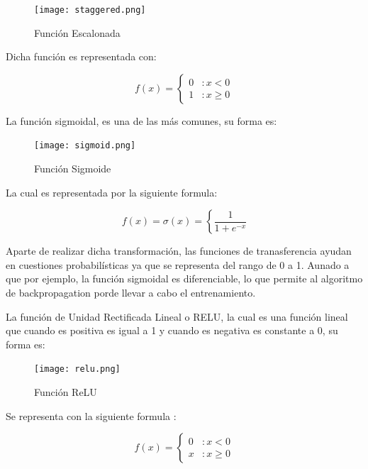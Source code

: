                 \begin{figure}[H]
                    \centering
                    \texttt{[image: staggered.png]}
                    \caption{Funci\'on Escalonada}
                    \label{fig:fig4}
                \end{figure}

                Dicha funci\'on es representada con: 
                
                \[f(x) = \left\{ \begin{array}{lr} 0 & : x < 0\\ 1 & : x \ge 0 \end{array} \right. \]

                La funci\'on sigmoidal, es una de las m\'as comunes, su forma es: 

                \begin{figure}[H]
                    \centering
                    \texttt{[image: sigmoid.png]}
                    \caption{Funci\'on Sigmoide}
                    \label{fig:fig5}
                \end{figure}

                La cual es representada por la siguiente formula:

                \[f(x) = \sigma(x) =  \left\{ \frac{1}{1 + e^{-x}} \right. \]

                Aparte de realizar dicha transformación, las funciones de tranasferencia ayudan en 
                cuestiones probabil\'isticas ya que se representa del rango de 0 a 1.  Aunado a que por ejemplo, la función sigmoidal es diferenciable, lo que permite al algoritmo de backpropagation porde llevar a cabo el entrenamiento.

                La funci\'on de Unidad Rectificada Lineal o RELU, la cual es una funci\'on lineal
                que cuando es positiva es igual a 1 y cuando es negativa es constante a 0, su forma es: \label{subsec: relu}

                \begin{figure}[H]
                    \centering
                    \texttt{[image: relu.png]}
                    \caption{Funci\'on ReLU}
                    \label{fig:fig6}
                \end{figure}

                Se representa con la siguiente formula \cite{Freire2021}: 

                \[f(x) = \left\{ \begin{array}{lr} 0 & : x < 0\\ x & : x \ge 0 \end{array} \right. \]

